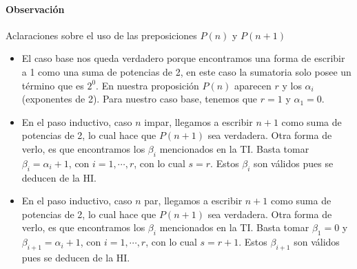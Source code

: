 \paragraph{Observación}{
  Aclaraciones sobre el uso de las preposiciones $P(n)$ y $P(n+1)$
  \begin{itemize}
    \item El caso base nos queda verdadero porque encontramos una forma de escribir a 1 como una suma de potencias
          de 2, en este caso la sumatoria solo posee un término que es $2^0$. En nuestra proposición $P(n)$ aparecen $r$
          y los $\alpha_i$ (exponentes de 2). Para nuestro caso base, tenemos que $r = 1$ y $\alpha_1 = 0$.
    \item En el paso inductivo, caso $n$ impar, llegamos a escribir $n+1$ como suma de potencias de 2, lo cual
          hace que $P(n+1)$ sea verdadera. Otra forma de verlo, es que encontramos los $\beta_i$ mencionados en la TI.
          Basta tomar $\beta_i = \alpha_i + 1$, con $i = 1, \cdots , r$, con lo cual $s = r$. Estos $\beta_i$ son válidos
          pues se deducen de la HI.
    \item En el paso inductivo, caso $n$ par, llegamos a escribir $n+1$ como suma de potencias de 2, lo cual
          hace que $P(n+1)$ sea verdadera. Otra forma de verlo, es que encontramos los $\beta_i$ mencionados en la TI.
          Basta tomar $\beta_1 = 0$ y $\beta_{i+1} = \alpha_i + 1$, con $i = 1, \cdots , r$, con lo cual $s = r + 1$.
          Estos $\beta_{i+1}$ son válidos pues se deducen de la HI.
  \end{itemize}
}

\begin{aportes}
  \item {}
\end{aportes}
